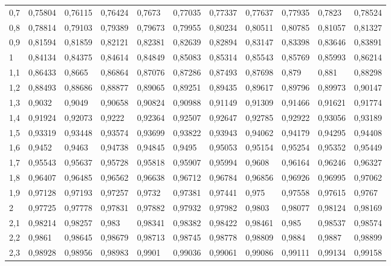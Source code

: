 \documentclass[4apaper,12pt]{book}
\begin{document}
\begin{description}
\begin{table}[]
\begin{tabular}{lllllllllll}
        0,7 & 0,75804 & 0,76115 & 0,76424 & 0,7673  & 0,77035 & 0,77337 & 0,77637 & 0,77935 & 0,7823  & 0,78524 \\
        0,8 & 0,78814 & 0,79103 & 0,79389 & 0,79673 & 0,79955 & 0,80234 & 0,80511 & 0,80785 & 0,81057 & 0,81327 \\
        0,9 & 0,81594 & 0,81859 & 0,82121 & 0,82381 & 0,82639 & 0,82894 & 0,83147 & 0,83398 & 0,83646 & 0,83891 \\
        1   & 0,84134 & 0,84375 & 0,84614 & 0,84849 & 0,85083 & 0,85314 & 0,85543 & 0,85769 & 0,85993 & 0,86214 \\
        1,1 & 0,86433 & 0,8665  & 0,86864 & 0,87076 & 0,87286 & 0,87493 & 0,87698 & 0,879   & 0,881   & 0,88298 \\
        1,2 & 0,88493 & 0,88686 & 0,88877 & 0,89065 & 0,89251 & 0,89435 & 0,89617 & 0,89796 & 0,89973 & 0,90147 \\
        1,3 & 0,9032  & 0,9049  & 0,90658 & 0,90824 & 0,90988 & 0,91149 & 0,91309 & 0,91466 & 0,91621 & 0,91774 \\
        1,4 & 0,91924 & 0,92073 & 0,9222  & 0,92364 & 0,92507 & 0,92647 & 0,92785 & 0,92922 & 0,93056 & 0,93189 \\
        1,5 & 0,93319 & 0,93448 & 0,93574 & 0,93699 & 0,93822 & 0,93943 & 0,94062 & 0,94179 & 0,94295 & 0,94408 \\
        1,6 & 0,9452  & 0,9463  & 0,94738 & 0,94845 & 0,9495  & 0,95053 & 0,95154 & 0,95254 & 0,95352 & 0,95449 \\
        1,7 & 0,95543 & 0,95637 & 0,95728 & 0,95818 & 0,95907 & 0,95994 & 0,9608  & 0,96164 & 0,96246 & 0,96327 \\
        1,8 & 0,96407 & 0,96485 & 0,96562 & 0,96638 & 0,96712 & 0,96784 & 0,96856 & 0,96926 & 0,96995 & 0,97062 \\
        1,9 & 0,97128 & 0,97193 & 0,97257 & 0,9732  & 0,97381 & 0,97441 & 0,975   & 0,97558 & 0,97615 & 0,9767  \\
        2   & 0,97725 & 0,97778 & 0,97831 & 0,97882 & 0,97932 & 0,97982 & 0,9803  & 0,98077 & 0,98124 & 0,98169 \\
        2,1 & 0,98214 & 0,98257 & 0,983   & 0,98341 & 0,98382 & 0,98422 & 0,98461 & 0,985   & 0,98537 & 0,98574 \\
        2,2 & 0,9861  & 0,98645 & 0,98679 & 0,98713 & 0,98745 & 0,98778 & 0,98809 & 0,9884  & 0,9887  & 0,98899 \\
        2,3 & 0,98928 & 0,98956 & 0,98983 & 0,9901  & 0,99036 & 0,99061 & 0,99086 & 0,99111 & 0,99134 & 0,99158 \\

\end{tabular}
\end{table}
\end{description}
\end{document}
